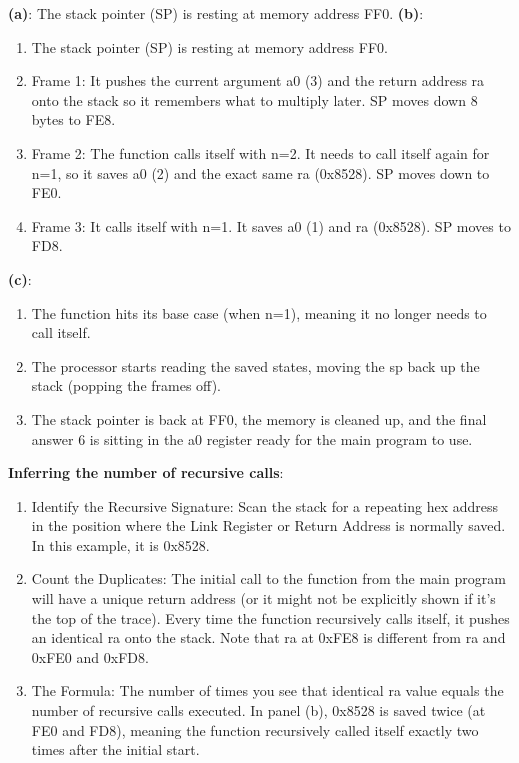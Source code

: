 \documentclass[../comorg-part1.tex]{subfiles}
\begin{document}
\noindent\textbf{(a)}: The stack pointer (SP) is resting at memory address FF0.\newline
\textbf{(b)}:
\begin{enumerate}
    \item The stack pointer (SP) is resting at memory address FF0.
    \item Frame 1: It pushes the current argument a0 (3) and the return address ra onto the stack so it remembers what to multiply later. SP moves down 8 bytes to FE8.
    \item Frame 2: The function calls itself with n=2. It needs to call itself again for n=1, so it saves a0 (2) and the exact same ra (0x8528). SP moves down to FE0.
    \item Frame 3: It calls itself with n=1. It saves a0 (1) and ra (0x8528). SP moves to FD8.
\end{enumerate}
\textbf{(c)}:
\begin{enumerate}
    \item The function hits its base case (when n=1), meaning it no longer needs to call itself.
    \item The processor starts reading the saved states, moving the sp back up the stack (popping the frames off).
    \item The stack pointer is back at FF0, the memory is cleaned up, and the final answer 6 is sitting in the a0 register ready for the main program to use.
\end{enumerate}
\textbf{Inferring the number of recursive calls}:
\begin{enumerate}
    \item Identify the Recursive Signature: Scan the stack for a repeating hex address in the position where the Link Register or Return Address is normally saved. In this example, it is 0x8528.
    \item Count the Duplicates: The initial call to the function from the main program will have a unique return address (or it might not be explicitly shown if it's the top of the trace). Every time the function recursively calls itself, it pushes an identical ra onto the stack.
    Note that ra at 0xFE8 is different from ra and 0xFE0 and 0xFD8.
    \item The Formula: The number of times you see that identical ra value equals the number of recursive calls executed. In panel (b), 0x8528 is saved twice (at FE0 and FD8), meaning the function recursively called itself exactly two times after the initial start.
\end{enumerate}
\end{document}
